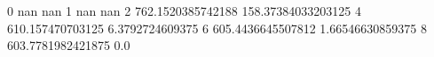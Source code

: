 0 nan nan
1 nan nan
2 762.1520385742188 158.37384033203125
4 610.157470703125 6.3792724609375
6 605.4436645507812 1.66546630859375
8 603.7781982421875 0.0
